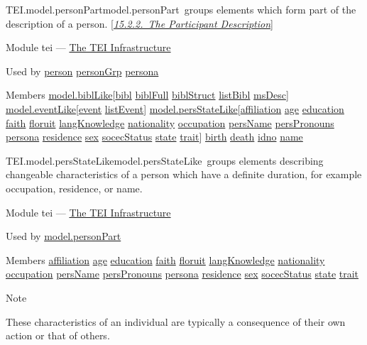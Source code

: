 \begin{reflist}
\item[]\begin{specHead}{TEI.model.personPart}{model.personPart} groups elements which form part of the description of a person. [\textit{\hyperref[CCAHPA]{15.2.2.\ The Participant Description}}]\end{specHead} 
    \item[{Module}]
  tei — \hyperref[ST]{The TEI Infrastructure}
    \item[{Used by}]
  \hyperref[TEI.person]{person} \hyperref[TEI.personGrp]{personGrp} \hyperref[TEI.persona]{persona}
    \item[{Members}]
  \hyperref[TEI.model.biblLike]{model.biblLike}[\hyperref[TEI.bibl]{bibl} \hyperref[TEI.biblFull]{biblFull} \hyperref[TEI.biblStruct]{biblStruct} \hyperref[TEI.listBibl]{listBibl} \hyperref[TEI.msDesc]{msDesc}] \hyperref[TEI.model.eventLike]{model.eventLike}[\hyperref[TEI.event]{event} \hyperref[TEI.listEvent]{listEvent}] \hyperref[TEI.model.persStateLike]{model.persStateLike}[\hyperref[TEI.affiliation]{affiliation} \hyperref[TEI.age]{age} \hyperref[TEI.education]{education} \hyperref[TEI.faith]{faith} \hyperref[TEI.floruit]{floruit} \hyperref[TEI.langKnowledge]{langKnowledge} \hyperref[TEI.nationality]{nationality} \hyperref[TEI.occupation]{occupation} \hyperref[TEI.persName]{persName} \hyperref[TEI.persPronouns]{persPronouns} \hyperref[TEI.persona]{persona} \hyperref[TEI.residence]{residence} \hyperref[TEI.sex]{sex} \hyperref[TEI.socecStatus]{socecStatus} \hyperref[TEI.state]{state} \hyperref[TEI.trait]{trait}] \hyperref[TEI.birth]{birth} \hyperref[TEI.death]{death} \hyperref[TEI.idno]{idno} \hyperref[TEI.name]{name}
\end{reflist}  
\begin{reflist}
\item[]\begin{specHead}{TEI.model.persStateLike}{model.persStateLike} groups elements describing changeable characteristics of a person which have a definite duration, for example occupation, residence, or name.\end{specHead} 
    \item[{Module}]
  tei — \hyperref[ST]{The TEI Infrastructure}
    \item[{Used by}]
  \hyperref[TEI.model.personPart]{model.personPart}
    \item[{Members}]
  \hyperref[TEI.affiliation]{affiliation} \hyperref[TEI.age]{age} \hyperref[TEI.education]{education} \hyperref[TEI.faith]{faith} \hyperref[TEI.floruit]{floruit} \hyperref[TEI.langKnowledge]{langKnowledge} \hyperref[TEI.nationality]{nationality} \hyperref[TEI.occupation]{occupation} \hyperref[TEI.persName]{persName} \hyperref[TEI.persPronouns]{persPronouns} \hyperref[TEI.persona]{persona} \hyperref[TEI.residence]{residence} \hyperref[TEI.sex]{sex} \hyperref[TEI.socecStatus]{socecStatus} \hyperref[TEI.state]{state} \hyperref[TEI.trait]{trait}
    \item[{Note}]
  \par
These characteristics of an individual are typically a consequence of their own action or that of others.
\end{reflist}  
